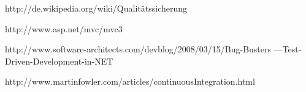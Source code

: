 {}

  http://de.wikipedia.org/wiki/Qualitätssicherung
  
  http://www.asp.net/mvc/mvc3
  
  http://www.software-architects.com/devblog/2008/03/15/Bug-Busters
  ---Test-Driven-Development-in-NET
  
  http://www.martinfowler.com/articles/continuousIntegration.html
  
  
